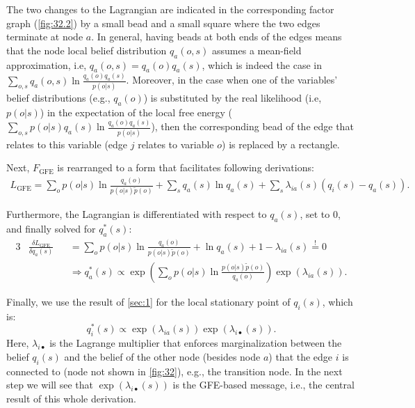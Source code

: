The two changes to the Lagrangian are indicated in the corresponding factor graph (\cref{fig:32.2}) by a small bead and a small square where the two edges terminate at node \(a\). In general, having beads at both ends of the edges means that the node local belief distribution \(q_a(o,s)\) assumes a mean-field approximation, i.e, \(q_a(o,s) = q_a(o)q_a(s)\), which is indeed the case in \(\sum_{o,s} q_a(o,s) \ln \frac{q_a(o)q_a(s)}{p(o|s)}\). Moreover, in the case when one of the variables' belief distributions (e.g., \(q_a(o)\)) is substituted by the real likelihood (i.e, \(p(o|s)\)) in the expectation of the local free energy (\(\sum_{o,s} p(o|s)q_a(s) \ln \frac{q_a(o)q_a(s)}{p(o|s)}\)), then the corresponding bead of the edge that relates to this variable (edge \(j\) relates to variable \(o\)) is replaced by a rectangle.

Next, \(F_{\text{GFE}}\) is rearranged to a form that facilitates following derivations:
\begin{align}
    L_{\text{GFE}} = \sum_{o} p(o|s) \ln \frac{q_a(o)}{p(o|s)\tilde{p}(o)} + \sum_s q_a(s) \ln q_a(s) + \sum_s \lambda_{ia}(s) \left( q_i(s) - q_a(s) \right).
\end{align}

Furthermore, the Lagrangian is differentiated with respect to \(q_a(s)\), set to \(0\), and finally solved for \(q^*_a(s)\):
\begin{alignat}{3}
     & \frac{\delta L_{\text{GFE}}}{\delta q_a(s)} &  & = \sum_{o} p(o|s) \ln \frac{q_a(o)}{p(o|s)\tilde{p}(o)} + \ln q_a(s) + 1 - \lambda_{ia}(s) \overset{!}{=} 0                                \\
     &                                             &  & \Rightarrow q^*_a(s) \propto \exp \left( \sum_{o} p(o|s) \ln \frac{p(o|s)\tilde{p}(o)}{q_a(o)} \right) \exp \left( \lambda_{ia}(s) \right).
\end{alignat}

Finally, we use the result of \cref{sec:1} for the local stationary point of \(q_i(s)\), which is:
\begin{equation}
    q^*_i(s) \propto \exp \left( \lambda_{ia}(s) \right) \exp \left( \lambda_{i\bullet}(s) \right).
\end{equation}
Here, \(\lambda_{i\bullet}\) is the Lagrange multiplier that enforces marginalization between the belief \(q_i(s)\) and the belief of the other node (besides node \(a\)) that the edge \(i\) is connected to (node not shown in \cref{fig:32}), e.g., the transition node. In the next step we will see that \(\exp \left( \lambda_{i\bullet}(s) \right)\) is the GFE-based message, i.e., the central result of this whole derivation.

